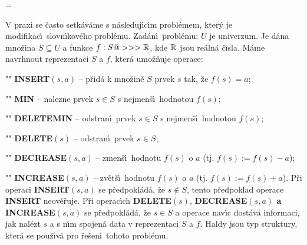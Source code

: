 


\magnification=
\pagewidth{5.4in}




\def \emph#1{\underbar{#1}}
\def \Prob{\operatorname{Prob}}
\def \count{\operatorname{count}}
\def \NIL{\operatorname{NIL}}
\def \otec{\operatorname{otec}}
\def \list{\operatorname{list}}
\def \Prv{\operatorname{Prv}}
\def \Nasl{\operatorname{Nasl}}
\def \levy{\operatorname{levy}}
\def \pravy{\operatorname{pravy}}
\def \key{\operatorname{key}}
\def \Prst{\operatorname{Prst}}
\def \hloubka{\operatorname{hloubka}}
\def \bratr{\operatorname{bratr}}
\def \npl{\operatorname{npl}}
\def \Cont{\operatorname{Cont}}

\flushpar V praxi se \v casto setk\'av\'ame s n\'asleduj\'\i c\'\i m 
probl\'emem, kter\'y je modifikac\'\i\ slovn\'\i kov\'eho 
probl\'emu.\newline 
Zad\'an\'\i\ probl\'emu: $U$ je univerzum. Je d\'ana mno\v zina 
$S\subseteq U$ a funkce $f:S@>>>\Bbb R$, kde $\Bbb R$ jsou re\'aln\'a \v c\'\i sla.
M\'ame navrhnout reprezentaci $S$ a $f$, kter\'a umo\v z\v nuje 
operace:
\roster
\item"{}"
{\bf INSERT$\left(s,a\right)$} -- p\v rid\'a k mno\v zin\v e $S$ prvek $s$ tak, \v ze 
$f\left(s\right)=a$;
\item"{}" 
{\bf MIN} -- nalezne prvek $s\in S$ s nejmen\v s\'\i\ hodnotou 
$f\left(s\right)$;
\item"{}" 
{\bf DELETEMIN} -- odstran\'\i\ prvek $s\in S$ s nejmen\v s\'\i\ hodnotou 
$f\left(s\right)$;
\item"{}" 
{\bf DELETE$\left(s\right)$} -- odstran\'\i\ prvek $s\in S$;
\item"{}"
{\bf DECREASE$\left(s,a\right)$} -- zmen\v s\'\i\ hodnotu $f\left(s\right)$ o $a$ (tj. 
$f\left(s\right):=f\left(s\right)-a$);
\item"{}"
{\bf INCREASE$\left(s,a\right)$} -- zv\v et\v s\'\i\ hodnotu $f\left(s\right)$ o $a$ (tj. 
$f\left(s\right):=f\left(s\right)+a$).
\endroster 
P\v ri operaci {\bf INSERT$\left(s,a\right)$} se p\v redpokl\'ad\'a, \v ze $
s\notin S$, tento 
p\v redpoklad operace {\bf INSERT} neov\v e\v ruje. P\v ri operac\'\i ch {\bf DE\-LE\-TE$
\left(s\right)$},
{\bf DECREASE$\left(s,a\right)$ a INCREASE$\left(s,a\right)$} se p\v red\-pokl\'ad\'a, \v ze $
s\in S$ a 
operace nav\'\i c dost\'av\'a informaci, jak nal\'ezt $s$ a s n\'\i m 
spojen\'a data v reprezentaci $S$ a $f$. Haldy jsou typ 
struktury, kter\'a se pou\v z\'\i v\'a pro \v re\v sen\'\i\ tohoto probl\'emu. 
\medskip

